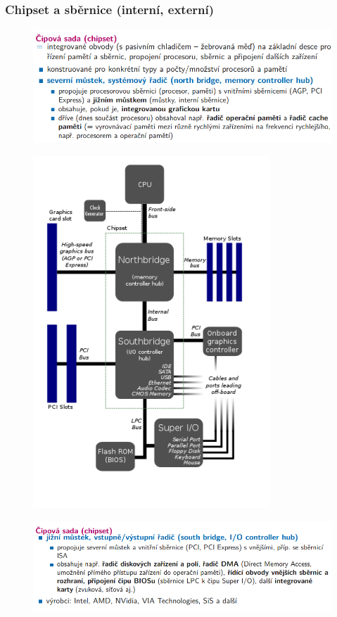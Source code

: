 \documentclass[10pt,a4paper]{article}
\begin{document}
\subsubsection{Chipset a sběrnice (interní, externí)}
\begin{figure} [h]
	\includegraphics[scale=0.65]{img/prvni_odstavec/otazka4/cipova_sada1.png}	
\end{figure}

\begin{figure} [h]
	\includegraphics[scale=0.65]{img/prvni_odstavec/otazka4/cipova_sada2.png}	
\end{figure}

\begin{figure} [h]
	\includegraphics[scale=0.65]{img/prvni_odstavec/otazka4/cipova_sada3.png}	
\end{figure}
\end{document}
